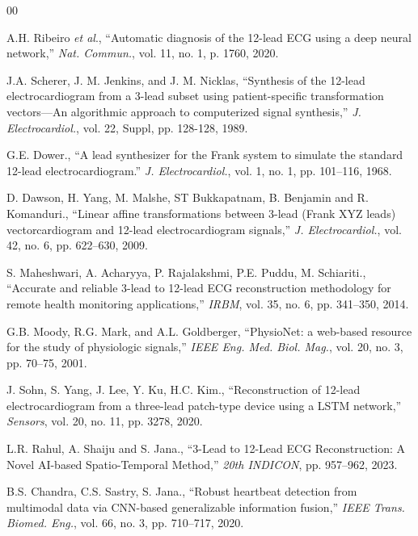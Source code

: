 \documentclass[conference]{IEEEtran}
\begin{document}
\begin{thebibliography}{00}

 A.H. Ribeiro \textit{et al}., ``Automatic diagnosis of the 12-lead ECG using a deep neural network,'' \textit{Nat. Commun.}, vol. 11, no. 1, p. 1760, 2020.


 J.A. Scherer, J. M. Jenkins, and J. M. Nicklas, ``Synthesis of the 12-lead electrocardiogram from a 3-lead subset using patient-specific transformation vectors—An algorithmic approach to computerized signal synthesis,'' \textit{J. Electrocardiol.}, vol. 22, Suppl, pp. 128-128, 1989.

 G.E. Dower., ``A lead synthesizer for the Frank system to simulate the standard 12-lead electrocardiogram.'' \textit{J. Electrocardiol.}, vol. 1, no. 1, pp. 101--116, 1968.

 D. Dawson, H. Yang, M. Malshe, ST Bukkapatnam, B. Benjamin and R. Komanduri., ``Linear affine transformations between 3-lead (Frank XYZ leads) vectorcardiogram and 12-lead electrocardiogram signals,'' \textit{J. Electrocardiol.}, vol. 42, no. 6, pp. 622–630, 2009.


 S. Maheshwari, A. Acharyya, P. Rajalakshmi, P.E. Puddu, M. Schiariti., ``Accurate and reliable 3-lead to 12-lead ECG reconstruction methodology for remote health monitoring applications,'' \textit{IRBM}, vol. 35, no. 6, pp. 341--350, 2014.

 G.B. Moody, R.G. Mark, and A.L. Goldberger, ``PhysioNet: a web-based resource for the study of physiologic signals,'' \textit{IEEE Eng. Med. Biol. Mag.}, vol. 20, no. 3, pp. 70--75, 2001.

 J. Sohn, S. Yang, J. Lee, Y. Ku, H.C. Kim., ``Reconstruction of 12-lead electrocardiogram from a three-lead patch-type device using a LSTM network,'' \textit{Sensors}, vol. 20, no. 11, pp. 3278, 2020.

 L.R. Rahul, A. Shaiju and S. Jana., ``3-Lead to 12-Lead ECG Reconstruction: A Novel AI-based Spatio-Temporal Method,'' \textit{20th INDICON}, pp. 957--962, 2023.

 B.S. Chandra, C.S. Sastry, S. Jana., ``Robust heartbeat detection from multimodal data via CNN-based generalizable information fusion,'' \textit{IEEE Trans. Biomed. Eng.}, vol. 66, no. 3, pp. 710--717, 2020.


\end{thebibliography}
\end{document}
